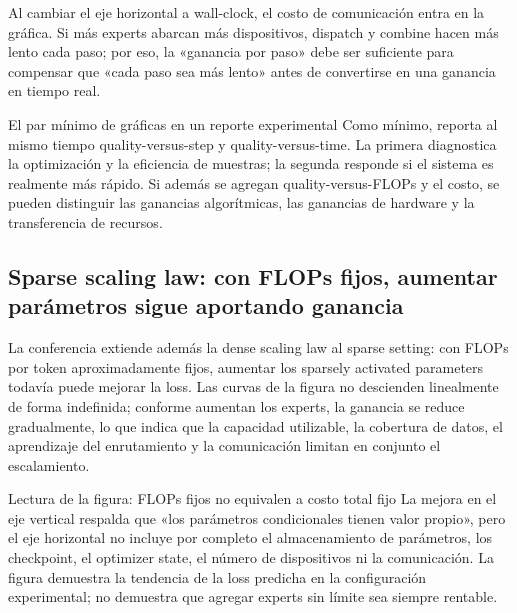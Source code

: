 Al cambiar el eje horizontal a wall-clock, el costo de comunicación entra en la gráfica. Si más experts abarcan más dispositivos, dispatch y combine hacen más lento cada paso; por eso, la «ganancia por paso» debe ser suficiente para compensar que «cada paso sea más lento» antes de convertirse en una ganancia en tiempo real.


\begin{importantbox}{El par mínimo de gráficas en un reporte experimental}
Como mínimo, reporta al mismo tiempo quality-versus-step y quality-versus-time. La primera diagnostica la optimización y la eficiencia de muestras; la segunda responde si el sistema es realmente más rápido. Si además se agregan quality-versus-FLOPs y el costo, se pueden distinguir las ganancias algorítmicas, las ganancias de hardware y la transferencia de recursos.
\end{importantbox}

\subsection{Sparse scaling law: con FLOPs fijos, aumentar parámetros sigue aportando ganancia}

La conferencia extiende además la dense scaling law al sparse setting: con FLOPs por token aproximadamente fijos, aumentar los sparsely activated parameters todavía puede mejorar la loss. Las curvas de la figura no descienden linealmente de forma indefinida; conforme aumentan los experts, la ganancia se reduce gradualmente, lo que indica que la capacidad utilizable, la cobertura de datos, el aprendizaje del enrutamiento y la comunicación limitan en conjunto el escalamiento.


\begin{knowledgebox}{Lectura de la figura: FLOPs fijos no equivalen a costo total fijo}
La mejora en el eje vertical respalda que «los parámetros condicionales tienen valor propio», pero el eje horizontal no incluye por completo el almacenamiento de parámetros, los checkpoint, el optimizer state, el número de dispositivos ni la comunicación. La figura demuestra la tendencia de la loss predicha en la configuración experimental; no demuestra que agregar experts sin límite sea siempre rentable.
\end{knowledgebox}

